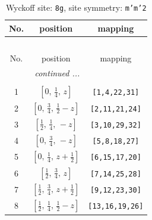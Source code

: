 \documentclass[fleqn,8pt]{jsarticle}
\begin{document}
\begin{longtable}{ccc}
\caption{Wyckoff site: {\tt 8g}, site symmetry: {\tt m'm'2}}
 \\
 \hline \hline
No. & position & mapping \\ \hline \endfirsthead

\multicolumn{2}{l}{\tablename\ \thetable{}} \\
 \hline \hline
No. & position & mapping \\ \hline \endhead

 \hline \hline
\multicolumn{2}{r}{\footnotesize\it continued ...} \\ \endfoot

 \hline \hline
\multicolumn{2}{r}{} \\ \endlastfoot

1 & $\left[ 0,\, \frac{1}{4},\, z \right]$ & {\tt [1,4,22,31]} \\ \hline
2 & $\left[ 0,\, \frac{3}{4},\, \frac{1}{2} - z \right]$ & {\tt [2,11,21,24]} \\ \hline
3 & $\left[ \frac{1}{2},\, \frac{1}{4},\, - z \right]$ & {\tt [3,10,29,32]} \\ \hline
4 & $\left[ 0,\, \frac{3}{4},\, - z \right]$ & {\tt [5,8,18,27]} \\ \hline
5 & $\left[ 0,\, \frac{1}{4},\, z + \frac{1}{2} \right]$ & {\tt [6,15,17,20]} \\ \hline
6 & $\left[ \frac{1}{2},\, \frac{3}{4},\, z \right]$ & {\tt [7,14,25,28]} \\ \hline
7 & $\left[ \frac{1}{2},\, \frac{3}{4},\, z + \frac{1}{2} \right]$ & {\tt [9,12,23,30]} \\ \hline
8 & $\left[ \frac{1}{2},\, \frac{1}{4},\, \frac{1}{2} - z \right]$ & {\tt [13,16,19,26]} \\
\end{longtable}
\renewcommand{\arraystretch}{1.2}
\end{document}
